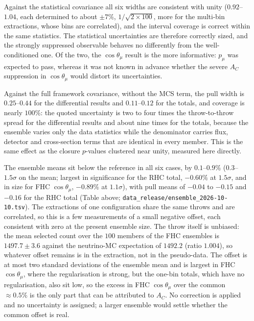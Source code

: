 \documentclass[11pt,a4paper]{article}
\begin{document}
Against the statistical covariance all six widths are consistent with unity ($0.92$--$1.04$,
each determined to about $\pm7\%$, $1/\sqrt{2\times100}$, more for the multi-bin extractions,
whose bins are correlated), and the interval coverage is correct within the same statistics. The
statistical uncertainties are therefore correctly sized, and the strongly suppressed observable
behaves no differently from the well-conditioned one. Of the two, the $\cos\theta_\mu$ result
is the more informative: $p_\mu$ was expected to pass, whereas it was not known in advance
whether the severe $A_C$ suppression in $\cos\theta_\mu$ would distort its uncertainties.

Against the full framework covariance, without the MCS term, the pull width
is $0.25$--$0.44$ for the differential results and $0.11$--$0.12$ for the totals, and coverage is
nearly $100\%$: the quoted
uncertainty is two to four times the throw-to-throw spread for the differential results and about
nine times for the totals, because the ensemble varies
only the data statistics while the denominator carries flux, detector and cross-section
terms that are identical in every member.  This is the same effect as the closure
$p$-values clustered near unity, measured here directly.

The ensemble means sit below the reference in all six cases, by $0.1$--$0.9\%$
($0.3$--$1.5\sigma$ on the mean; largest in significance for the RHC total, $-0.60\%$ at $1.5\sigma$,
and in size for FHC $\cos\theta_\mu$, $-0.89\%$ at $1.1\sigma$), with
pull means of $-0.04$ to $-0.15$ and $-0.16$ for the RHC total (Table above;
\texttt{data\_release/ensemble\_2026-10-10.tsv}). The
extractions of one configuration share the same throws and are correlated, so this is a few
measurements of a small negative offset, each consistent with zero at the present ensemble
size. The throw itself is unbiased: the mean selected count over the $100$
members of the FHC ensembles is $1497.7\pm3.6$ against the neutrino-MC expectation of $1492.2$ (ratio $1.004$), so
whatever offset remains is in the extraction, not in the pseudo-data. The offset is at most two standard
deviations of the ensemble mean and is largest in FHC $\cos\theta_\mu$, where the regularisation is strong,
but the one-bin totals, which have no regularisation, also sit low, so the excess in
FHC $\cos\theta_\mu$ over the common $\approx0.5\%$ is the only part that can be attributed
to $A_C$. No correction is applied and no uncertainty is assigned; a larger ensemble
would settle whether the common offset is real.
\end{document}
